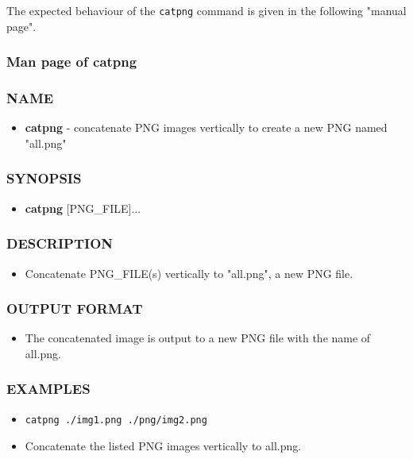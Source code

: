 The expected behaviour of the \verb+catpng+ command is given in the following "manual page".
\subsubsection{Man page of catpng}
\subsubsection*{NAME}
  \begin{itemize}
    \item[]{\bf catpng} - concatenate PNG images vertically to create a new PNG named "all.png"
  \end{itemize}
\subsubsection*{SYNOPSIS}
  \begin{itemize}
    \item[]{\bf catpng} [PNG\_FILE]... 
  \end{itemize}
\subsubsection*{DESCRIPTION}
  \begin{itemize}
  \item[]Concatenate PNG\_FILE(s) vertically to "all.png", a new PNG file.
  \end{itemize}
\subsubsection*{OUTPUT FORMAT}
  \begin{itemize}
  \item[]The concatenated image is output to  a new PNG file with the name of all.png.
  \end{itemize}
\subsubsection*{EXAMPLES}
\begin{itemize}
\item[]
\begin{verbatim}
catpng ./img1.png ./png/img2.png
\end{verbatim}
\item[]Concatenate the listed PNG images vertically to all.png.
\end{itemize}

